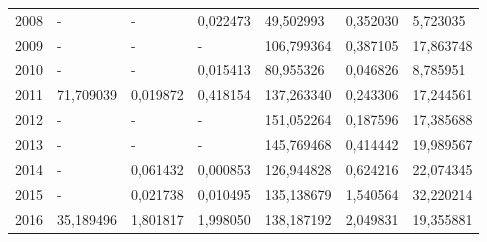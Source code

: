 \begin{table}
\begin{tabular}{p{1cm}p{2cm}p{2cm}p{2cm}p{2cm}p{2cm}p{2cm}}
 2008 &                                            - &                                          - &                                0,022473 &                      49,502993 &                               0,352030 &      5,723035 \\
 2009 &                                            - &                                          - &                                       - &                     106,799364 &                               0,387105 &     17,863748 \\
 2010 &                                            - &                                          - &                                0,015413 &                      80,955326 &                               0,046826 &      8,785951 \\
 2011 &                                    71,709039 &                                   0,019872 &                                0,418154 &                     137,263340 &                               0,243306 &     17,244561 \\
 2012 &                                            - &                                          - &                                       - &                     151,052264 &                               0,187596 &     17,385688 \\
 2013 &                                            - &                                          - &                                       - &                     145,769468 &                               0,414442 &     19,989567 \\
 2014 &                                            - &                                   0,061432 &                                0,000853 &                     126,944828 &                               0,624216 &     22,074345 \\
 2015 &                                            - &                                   0,021738 &                                0,010495 &                     135,138679 &                               1,540564 &     32,220214 \\
 2016 &                                    35,189496 &                                   1,801817 &                                1,998050 &                     138,187192 &                               2,049831 &     19,355881 \\
\bottomrule
\end{tabular}
\end{table}
